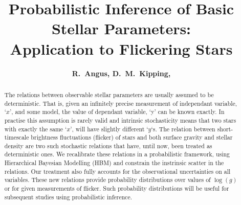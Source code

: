 \documentclass[apjl]{emulateapj}
\newcommand{\titledag}{$\dagger$}
\newcommand{\titledag}{\dagger}
\begin{document}
\title {Probabilistic Inference of Basic Stellar Parameters:\\
Application to Flickering Stars %
\altaffilmark{\titledag}}

\author{
	{\bf	R.~Angus,
		D.~M.~Kipping,
	}
}







\begin{abstract}

The relations between observable stellar parameters are usually assumed to be
deterministic.
That is, given an infinitely precise measurement of independant
variable, `$x$', and some model, the value of dependant variable, `y' can be
known exactly.
In practise this assumption is rarely valid and intrinsic stochasticity means
that two stars with exactly the same `$x$', will have slightly different
`$y$`s.
The relation between short-timescale brightness fluctuations (flicker) of stars
and both surface gravity \citep{bastien:2013} and stellar density
\citep{kipping:2014} are two such stochastic relations that have, until now,
been treated as deterministic ones.
We recalibrate these relations in a probabilistic framework, using
Hierarchical Bayesian Modelling (HBM) and constrain the instrinsic scatter in
the relations.
Our treatment also fully accounts for the observational uncertainties on all
variables.
These new relations provide probability distributions over values of $\log(g)$
or \rhostar for given measurements of flicker.
Such probability distributions will be useful for subsequent studies using
probabilistic inference.

\end{abstract}

\end{document}

